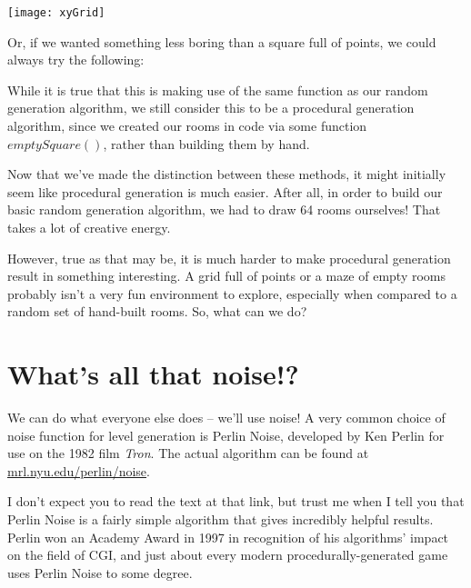 \documentclass[12pt,twoside]{reedthesis}
\begin{document}
\texttt{[image: xyGrid]}

Or, if we wanted something less boring than a square full of points, we could always try the following:
\begin{algorithm}
\end{algorithm}

While it is true that this is making use of the same function as our random generation algorithm, we still consider this to be a procedural generation algorithm, since we created our rooms in code via some function $emptySquare()$, rather than building them by hand.

Now that we've made the distinction between these methods, it might initially seem like procedural generation is much easier.
After all, in order to build our basic random generation algorithm, we had to draw 64 rooms ourselves! That takes a lot of creative energy.

However, true as that may be, it is much harder to make procedural generation result in something interesting. A grid full of points or a maze of empty rooms probably isn't a very fun environment to explore, especially when compared to a random set of hand-built rooms. So, what can we do?

\section{What's all that noise!?}
We can do what everyone else does -- we'll use noise!
A very common choice of noise function for level generation is Perlin Noise, developed by Ken Perlin for use on the 1982 film \textit{Tron}.
The actual algorithm can be found at \href{https://mrl.nyu.edu/perlin/noise}{mrl.nyu.edu/perlin/noise}.

I don't expect you to read the text at that link, but trust me when I tell you that Perlin Noise is a fairly simple algorithm that gives incredibly helpful results. Perlin won an Academy Award in 1997 in recognition of his algorithms' impact on the field of CGI, and just about every modern procedurally-generated game uses Perlin Noise to some degree.
\end{document}
